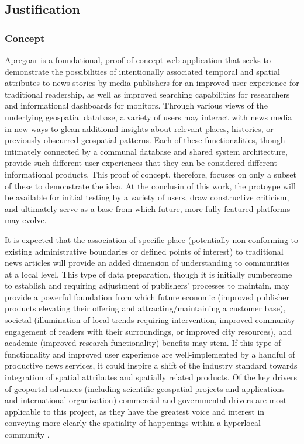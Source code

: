 \subsection {Justification}
\subsubsection{Concept}
Apregoar is a foundational, proof of concept web application that seeks to demonstrate the possibilities of intentionally associated temporal and spatial attributes to news stories by media publishers for an improved user experience for traditional readership, as well as improved searching capabilities for researchers and informational dashboards for monitors. Through various views of the underlying geospatial database, a variety of users may interact with news media in new ways to glean additional insights about relevant places, histories, or previously obscurred geospatial patterns. Each of these functionalities, though intimately connected by a communal database and shared system architecture, provide such different user experiences that they can be considered different informational products. This proof of concept, therefore, focuses on only a subset of these to demonstrate the idea. At the conclusin of this work, the protoype will be available for initial testing by a variety of users, draw constructive criticism, and ultimately serve as a base from which future, more fully featured platforms may evolve. 

 It is expected that the association of specific place (potentially non-conforming to existing administrative boundaries or defined points of interest) to traditional news articles will provide an added dimension of understanding to communities at a local level.  This type of data preparation, though it is initially cumbersome to establish and requiring adjustment of publishers' processes to maintain, may provide a powerful foundation from which future economic (improved publisher products elevating their offering and attracting/maintaining a customer base), societal (illumination of local trends requiring intervention, improved community engagement of readers with their surroundings, or improved city resources), and academic (improved research functionality) benefits may stem.  If this type of functionality and improved user experience are well-implemented by a handful of productive news services, it could inspire a shift of the industry standard towards integration of spatial attributes and spatially related products. Of the key drivers of geoportal advances (including  scientific geospatial projects and applications and international organization) commercial and governmental drivers are most applicable to this project, as they have the greatest voice and interest in conveying more clearly the spatiality of happenings within a hyperlocal community \cite{Jiang2020}.%


